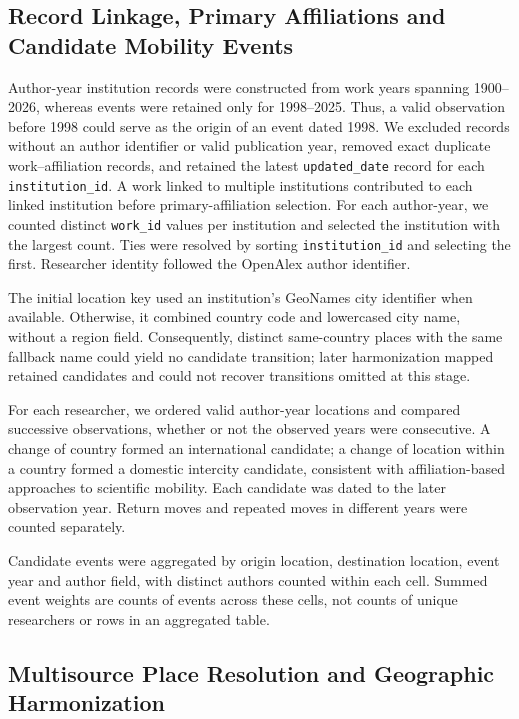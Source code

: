 \subsection{Record Linkage, Primary Affiliations and Candidate Mobility Events}

Author-year institution records were constructed from work years spanning 1900--2026, whereas events were retained only for 1998--2025. Thus, a valid observation before 1998 could serve as the origin of an event dated 1998. We excluded records without an author identifier or valid publication year, removed exact duplicate work--affiliation records, and retained the latest \texttt{updated\_date} record for each \texttt{institution\_id}. A work linked to multiple institutions contributed to each linked institution before primary-affiliation selection. For each author-year, we counted distinct \texttt{work\_id} values per institution and selected the institution with the largest count. Ties were resolved by sorting \texttt{institution\_id} and selecting the first. Researcher identity followed the OpenAlex author identifier.

The initial location key used an institution's GeoNames city identifier when available. Otherwise, it combined country code and lowercased city name, without a region field. Consequently, distinct same-country places with the same fallback name could yield no candidate transition; later harmonization mapped retained candidates and could not recover transitions omitted at this stage.

For each researcher, we ordered valid author-year locations and compared successive observations, whether or not the observed years were consecutive. A change of country formed an international candidate; a change of location within a country formed a domestic intercity candidate, consistent with affiliation-based approaches to scientific mobility\cite{ref004,ref013}. Each candidate was dated to the later observation year. Return moves and repeated moves in different years were counted separately.

Candidate events were aggregated by origin location, destination location, event year and author field, with distinct authors counted within each cell. Summed event weights are counts of events across these cells, not counts of unique researchers or rows in an aggregated table.

\subsection{Multisource Place Resolution and Geographic Harmonization}
\label{methods:geography}

